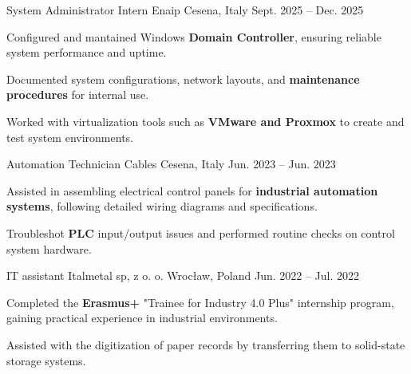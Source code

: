 \begin{cventries}
\cventry
    {System Administrator Intern} %
    {Enaip} %
    {Cesena, Italy} %
    {Sept. 2025 -- Dec. 2025} %
    {
      \begin{cvitems} %
        \item {Configured and mantained Windows \textbf{Domain Controller}, ensuring reliable system performance and uptime.}
        \item {Documented system configurations, network layouts, and \textbf{maintenance procedures} for internal use.}
        \item {Worked with virtualization tools such as \textbf{VMware and Proxmox } to create and test system environments.}
      \end{cvitems}
    }

\cventry
    {Automation Technician} %
    {Cables} %
    {Cesena, Italy} %
    {Jun. 2023 -- Jun. 2023} %
    {
      \begin{cvitems} %
        \item {Assisted in assembling electrical control panels for \textbf{industrial automation systems}, following detailed wiring diagrams and specifications.}
        \item {Troubleshot \textbf{PLC} input/output issues and performed routine checks on control system hardware.}
      \end{cvitems}
    }

\cventry
    {IT assistant} %
    {Italmetal sp, z o. o.} %
    {Wrocław, Poland} %
    {Jun. 2022 -- Jul. 2022} %
    {
    \begin{cvitems} %
        \item {Completed the \textbf{Erasmus+} "Trainee for Industry 4.0 Plus" internship program, gaining practical experience in industrial environments.}
        \item {Assisted with the digitization of paper records by transferring them to solid-state storage systems.}
    \end{cvitems}
    }

\end{cventries}
